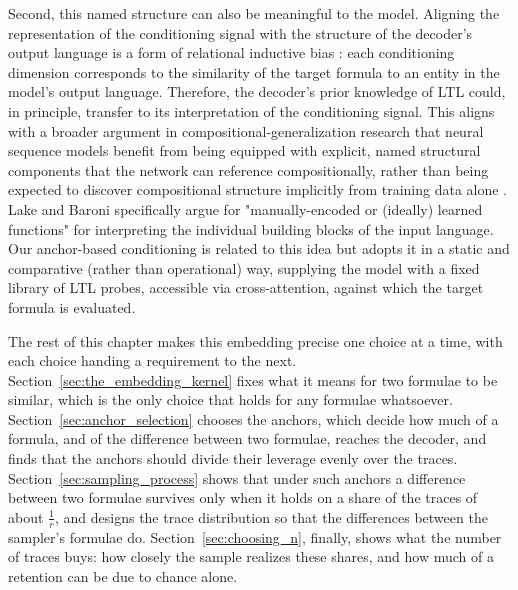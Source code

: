 \documentclass[titlepage,a4paper,11pt]{report}
\newenvironment{RSnewblock}{\par\color{blue!65!black}}{\par}
\begin{document}
    Second, this named structure can also be meaningful to the model. Aligning the representation of the conditioning signal with the structure of the decoder's output language is a form of relational inductive bias \citep{battaglia_relational_2018}: each conditioning dimension corresponds to the similarity of the target formula to an entity in the model's output language. Therefore, the decoder's prior knowledge of LTL could, in principle, transfer to its interpretation of the conditioning signal. This aligns with a broader argument in compositional-generalization research that neural sequence models benefit from being equipped with explicit, named structural components that the network can reference compositionally, rather than being expected to discover compositional structure implicitly from training data alone \citep{lake_building_2017, lake_generalization_2018}. Lake and Baroni \citep{lake_generalization_2018} specifically argue for "manually-encoded or (ideally) learned functions" for interpreting the individual building blocks of the input language. Our anchor-based conditioning is related to this idea but adopts it in a static and comparative (rather than operational) way, supplying the model with a fixed library of LTL probes, accessible via cross-attention, against which the target formula is evaluated. 
    
    \begin{RSnewblock}
    The rest of this chapter makes this embedding precise one choice at a time, with each choice handing a requirement to the next. Section~\ref{sec:the_embedding_kernel} fixes what it means for two formulae to be similar, which is the only choice that holds for any formulae whatsoever. Section~\ref{sec:anchor_selection} chooses the anchors, which decide how much of a formula, and of the difference between two formulae, reaches the decoder, and finds that the anchors should divide their leverage evenly over the traces. Section~\ref{sec:sampling_process} shows that under such anchors a difference between two formulae survives only when it holds on a share of the traces of about $\frac1r$, and designs the trace distribution so that the differences between the sampler's formulae do. Section~\ref{sec:choosing_n}, finally, shows what the number of traces buys: how closely the sample realizes these shares, and how much of a retention can be due to chance alone.
    \end{RSnewblock}
\end{document}
